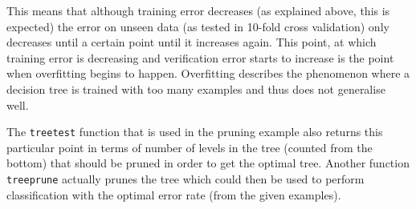 \documentclass[11pt,a4paper]{article}
\begin{document}
This means that although training error decreases (as explained above, this is expected) the error on unseen data (as tested in 10-fold cross validation) only decreases until a certain point until it increases again. This point, at which training error is decreasing and verification error starts to increase is the point when overfitting begins to happen. Overfitting describes the phenomenon where a decision tree is trained with too many examples and thus does not generalise well.

The \texttt{treetest} function that is used in the pruning example also returns this particular point in terms of number of levels in the tree (counted from the bottom) that should be pruned in order to get the optimal tree. Another function \texttt{treeprune} actually prunes the tree which could then be used to perform classification with the optimal error rate (from the given examples).
\end{document}

